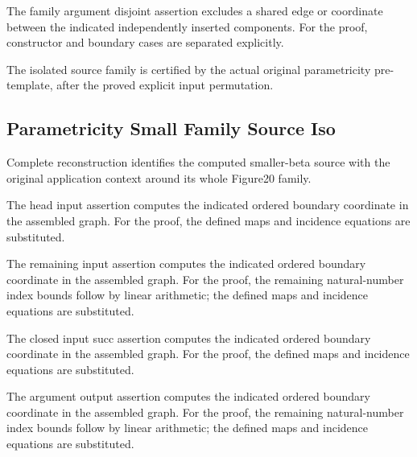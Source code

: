 The family argument disjoint assertion excludes a shared edge or coordinate between the indicated independently inserted components.
For the proof, constructor and boundary cases are separated explicitly.
\par{}

The isolated source family is certified by the actual original parametricity pre-template, after the proved explicit input permutation.
\par{}

\subsection{Parametricity Small Family Source Iso}
Complete reconstruction identifies the computed smaller-beta source with the original application context around its whole Figure20 family.

The head input assertion computes the indicated ordered boundary coordinate in the assembled graph.
For the proof, the defined maps and incidence equations are substituted.
\par{}

The remaining input assertion computes the indicated ordered boundary coordinate in the assembled graph.
For the proof, the remaining natural-number index bounds follow by linear arithmetic; the defined maps and incidence equations are substituted.
\par{}

The closed input succ assertion computes the indicated ordered boundary coordinate in the assembled graph.
For the proof, the defined maps and incidence equations are substituted.
\par{}

The argument output assertion computes the indicated ordered boundary coordinate in the assembled graph.
For the proof, the remaining natural-number index bounds follow by linear arithmetic; the defined maps and incidence equations are substituted.
\par{}

